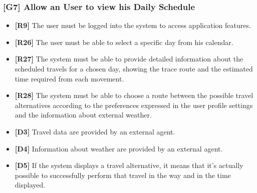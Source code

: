 \subsubsection{[G7] Allow an User to view his Daily Schedule}
	\begin{itemize}
		\item \textbf{[R9]} The user must be logged into the system to access application features.
		\item \textbf{[R26]} The user must be able to select a specific day from his calendar.
		\item \textbf{[R27]} The system must be able to provide detailed information about the scheduled travels for a chosen day, showing the trace route and the estimated time required from each movement.
		\item \textbf{[R28]} The system must be able to choose a route between the possible travel alternatives according to the preferences expressed in the user profile settings and the information about external weather.
		\item \textbf{[D3]} Travel data are provided by an external agent.
		\item \textbf{[D4]} Information about weather are provided by an external agent.
		\item \textbf{[D5]} If the system displays a travel alternative, it means that it’s actually possible to successfully perform that travel in the way and in the time displayed.
		
	\end{itemize}
